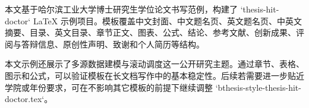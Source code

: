 本文基于哈尔滨工业大学博士研究生学位论文书写范例，构建了 `thesis-hit-doctor` LaTeX 示例项目。模板覆盖中文封面、中文题名页、英文题名页、中英文摘要、目录、英文目录、章节正文、图表、公式、结论、参考文献、创新成果、评阅与答辩信息、原创性声明、致谢和个人简历等结构。

本文示例还展示了多源数据建模与滚动调度这一公开研究主题。通过章节、表格、图示和公式，可以验证模板在长文档写作中的基本稳定性。后续若需要进一步贴近学院或年份要求，可在不影响其它模板的前提下继续调整 `bthesis-style-thesis-hit-doctor.tex`。
